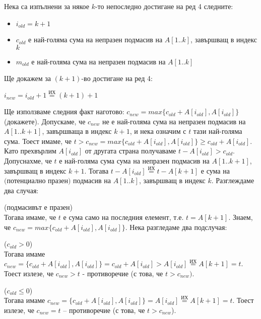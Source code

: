 \begin{maintenance}
	Нека са изпълнени за някое $k$-то непоследно достигане на ред 4 следните:
	\begin{itemize}
		\item $i_{old}=k+1$
		\item $c_{old}$ е най-голяма сума на непразен подмасив на $A[1..k]$, завършващ в индекс $k$
		\item $m_{old}$ е най-голяма сума на непразен подмасив на $A[1..k]$
	\end{itemize}
	Ще докажем за $(k+1)$-во достигане на ред 4:
	\begin{itemize}
		\item $i_{new}=i_{old}+1\overset{\text{ИХ}}=(k+1)+1$
		\item Ще използваме следния факт наготово: $c_{new}=max\{c_{old}+A[i_{old}],A[i_{old}]\}$ (докажете).
		Допускаме, че $c_{new}$ не е най-голяма сума на непразен подмасив на $A[1..k+1]$, завършваща в индекс $k+1$, и нека означим с $t$ тази най-голяма сума. Тоест имаме, че $t>c_{new}=max\{c_{old}+A[i_{old}],A[i_{old}]\}\ge c_{old}+A[i_{old}]$. Като прехвърлим $A[i_{old}]$ от другата страна получаваме $t-A[i_{old}]>c_{old}$.
		Допуснахме, че $t$ е най-голяма сума сума на непразен подмасив на $A[1..k+1]$, завършващ в индекс $k+1$. Тогава $t-A[i_{old}]\overset{\text{ИХ}}=t-A[k+1]$ е сума на $\textbf{(потенциално празен)}$ подмасив на $A[1..k]$, завършващ в индекс $k$. Разглеждаме два случая:
			

\end{mycase}
\end{itemize}
\end{maintenance}
